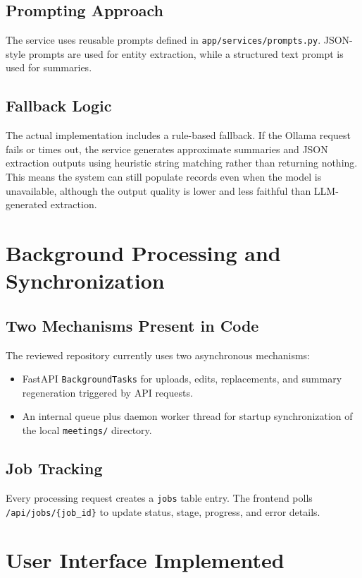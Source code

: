 \documentclass[12pt, a4paper]{article}
\begin{document}
\subsection{Prompting Approach}
The service uses reusable prompts defined in \texttt{app/services/prompts.py}. JSON-style prompts are used for entity extraction, while a structured text prompt is used for summaries.

\subsection{Fallback Logic}
The actual implementation includes a rule-based fallback. If the Ollama request fails or times out, the service generates approximate summaries and JSON extraction outputs using heuristic string matching rather than returning nothing. This means the system can still populate records even when the model is unavailable, although the output quality is lower and less faithful than LLM-generated extraction.

\section{Background Processing and Synchronization}
\subsection{Two Mechanisms Present in Code}
The reviewed repository currently uses two asynchronous mechanisms:
\begin{itemize}
\item FastAPI \texttt{BackgroundTasks} for uploads, edits, replacements, and summary regeneration triggered by API requests.
\item An internal queue plus daemon worker thread for startup synchronization of the local \texttt{meetings/} directory.
\end{itemize}

\subsection{Job Tracking}
Every processing request creates a \texttt{jobs} table entry. The frontend polls \texttt{/api/jobs/\{job\_id\}} to update status, stage, progress, and error details.

\section{User Interface Implemented}
\end{document}
